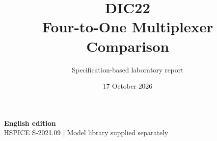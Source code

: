 \documentclass[11pt,a4paper]{article}
\title{\color{accent}DIC22\\[4pt]Four-to-One Multiplexer Comparison}
\author{Specification-based laboratory report}
\date{17 October 2026}
\begin{document}
\maketitle
\begin{center}\small\textbf{English edition}\\
HSPICE S-2021.09 \quad | \quad Model library supplied separately
\end{center}


\end{document}
